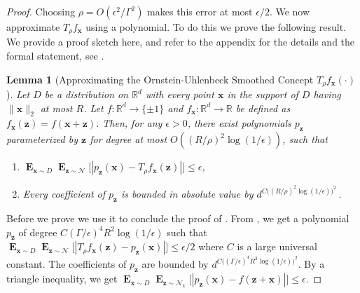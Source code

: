 \documentclass[10pt,a4paper]{article}
\newtheorem{lemma}{Lemma}[section]
\newcommand\twonorm[1]{\|#1\|_2}
\renewcommand\vec[1]{\mathbf{#1}}
\DeclareMathOperator*{\E}{\mathbf{E}}
\newcommand{\R}{\mathbb{R}}
\newcommand{\1}{\Ind}
\newcommand{\x}{\vec x}
\newcommand{\z}{\vec z}
\newcommand{\Gauss}{\mathcal{N}}
\begin{document}
\begin{proof}
Choosing $\rho=O(\epsilon^2/\Gamma^2)$ makes this error at most $\epsilon/2$. 
    We now approximate $T_{\rho}f_{\x}$ using a polynomial.  
    To do this we prove the following result. We provide a proof sketch here, and refer to the appendix for the details and the formal statement, see .
\begin{lemma}[Approximating the Ornstein-Uhlenbeck Smoothed Concept $T_\rho f_{\vec x}(\cdot)$]
    \label{lem:ou_approx_bounded_main_body}
    Let $D$ be a distribution on $\R^d$ with every point $\x$ in the support of $D$ having $\twonorm{\x}$ at most $R$. Let $f:\R^d\to\{\pm 1\}$ and $f_{\x}:\R^d\to\R$ be defined as $f_{\x}(\z)=f(\x+\z)$. Then, for any $\epsilon>0$, there exist polynomials $p_{\z}$ parameterized by $\z$ 
    for degree at most  $O((R/\rho)^2\log(1/\epsilon))$, such that 
    \begin{enumerate}
        \item $\E_{\x \sim D}\E_{\z\sim \Gauss}\bigl[|p_{\z}(\x)-T_{\rho}f_{\x}(\z)|\bigr]\leq \epsilon$,
\item Every coefficient of $p_{\z}$ is bounded in absolute value by $d^{C\bigl((R/\rho)^2\log(1/\epsilon)\bigr)^2}$\,.
        
    \end{enumerate}
\end{lemma}
Before we prove  we use it to conclude the proof of .  From , we get a polynomial $p_{\z}$ of degree $C(\Gamma/\epsilon)^4 R^2\log(1/\epsilon)$ such that $\E_{\x\sim D}\E_{\z\sim \Gauss}\bigl[|T_{\rho}f_{\x}(\z)-p_{\z}(\x)|\bigr]\leq \epsilon/2$ where $C$ is a large universal constant.  
The coefficients of $p_{\z}$ are bounded by $d^{C\bigl((\Gamma/\epsilon)^4 R^2\log(1/\epsilon)\bigr)^2}$.    
By a triangle inequality, we get  $\E_{\x\sim D}\E_{\z\sim \Gauss_k}\bigl[|p_{\z}(\x)-f(\z+\x)|\bigr]\leq \epsilon$.

\end{proof}
\end{document}
